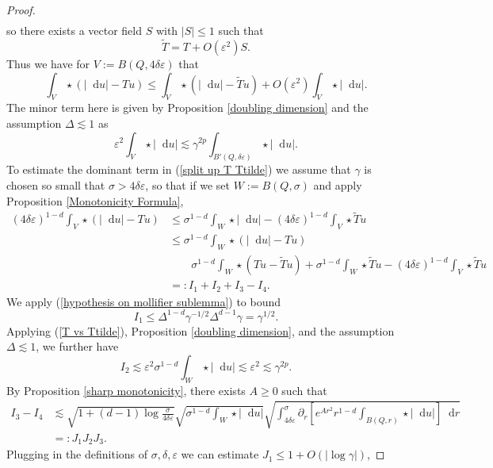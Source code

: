 \documentclass[reqno,12pt,letterpaper]{amsart}
\newcommand*\dif{\mathop{}\!\mathrm{d}}
\theoremstyle{definition}
\numberwithin{equation}{section}
\begin{document}
\begin{proof}
\begin{align*}
\end{align*}
so there exists a vector field $S$ with $|S| \leq 1$ such that
\begin{equation}\label{T vs Ttilde}
\tilde T = T + O(\varepsilon^2)S.
\end{equation}
Thus we have for $V := B(Q, 4\delta\varepsilon)$ that
\begin{equation}\label{split up T Ttilde}
\int_V \star (|\dif u| - Tu) \leq \int_V \star (|\dif u| - \tilde Tu) + O(\varepsilon^2) \int_V \star |\dif u|.
\end{equation}
The minor term here is given by Proposition \ref{doubling dimension} and the assumption $\Delta \lesssim 1$ as
$$\varepsilon^2 \int_V \star |\dif u| \lesssim \gamma^{2p} \int_{B'(Q, \delta\varepsilon)} \star |\dif u|.$$
To estimate the dominant term in (\ref{split up T Ttilde}) we assume that $\gamma$ is chosen so small that $\sigma > 4\delta\varepsilon$, so that if we set $W := B(Q, \sigma)$ and apply Proposition \ref{Monotonicity Formula},
\begin{align*}
(4\delta\varepsilon)^{1 - d} \int_V \star(|\dif u| - Tu)
&\leq \sigma^{1 - d}\int_W \star |\dif u| - (4\delta\varepsilon)^{1 - d}\int_V \star \tilde Tu\\
&\leq \sigma^{1 - d}\int_W \star(|\dif u| - Tu) \\
&\qquad \sigma^{1 - d} \int_W \star(Tu - \tilde Tu) + \sigma^{1 - d}\int_W \star \tilde Tu - (4\delta\varepsilon)^{1 - d}\int_V \star \tilde Tu\\
&=: I_1 + I_2 + I_3 - I_4.
\end{align*}
We apply (\ref{hypothesis on mollifier sublemma}) to bound
$$I_1 \leq \Delta^{1 - d} \gamma^{-1/2} \Delta^{d - 1} \gamma = \gamma^{1/2}.$$
Applying (\ref{T vs Ttilde}), Proposition \ref{doubling dimension}, and the assumption $\Delta \lesssim 1$, we further have
$$I_2 \lesssim \varepsilon^2 \sigma^{1 - d} \int_W \star |\dif u| \lesssim \varepsilon^2 \lesssim \gamma^{2p}.$$
By Proposition \ref{sharp monotonicity}, there exists $A \geq 0$ such that
\begin{align*}
I_3 - I_4 &\lesssim \sqrt{1 + (d - 1) \log \frac{\sigma}{4\delta\varepsilon}} \sqrt{\sigma^{1 - d} \int_W \star |\dif u|} \sqrt{\int_{4\delta\varepsilon}^\sigma \partial_r \left[e^{Ar^2} r^{1 - d} \int_{B(Q, r)} \star |\dif u|\right] \dif r}\\
&=: J_1 J_2 J_3.
\end{align*}
Plugging in the definitions of $\sigma, \delta, \varepsilon$ we can estimate $J_1 \leq 1 + O(|\log \gamma|)$,

\end{proof}
\end{document}
